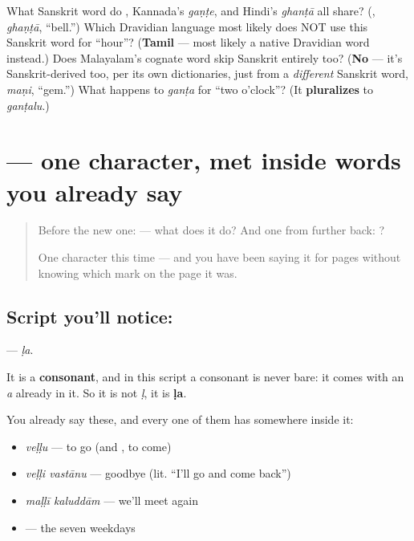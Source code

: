 \begin{tcolorbox}[breakable,colback=teal!4,colframe=teal!35!black,title={Before you move on}]
What Sanskrit word do \textbf{}, Kannada's \emph{gaṇṭe}, and Hindi's \emph{ghanṭā} all share? (\textbf{}, \emph{ghaṇṭā}, \textquotedblleft{}bell.\textquotedblright{}) Which Dravidian language most likely does NOT use this Sanskrit word for \textquotedblleft{}hour\textquotedblright{}? (\textbf{Tamil} — most likely a native Dravidian word instead.) Does Malayalam's cognate word skip Sanskrit entirely too? (\textbf{No} — it's Sanskrit-derived too, per its own dictionaries, just from a \emph{different} Sanskrit word, \emph{maṇi}, \textquotedblleft{}gem.\textquotedblright{}) What happens to \emph{ganṭa} for \textquotedblleft{}two o'clock\textquotedblright{}? (It \textbf{pluralizes} to \emph{ganṭalu}.)
\end{tcolorbox}
\section[\texorpdfstring{\te{ళ} (ḷa)}{ళ (ḷa)}]{ — one character, met inside words you already say}

\label{lesson:TE-S121-letter-lla}



\begin{quote}
Before the new one:  — what does it do? And one from further back: ?

One character this time — and you have been saying it for pages without knowing which mark on the page it was.
\end{quote}

\subsection*{Script you'll notice: }
\textbf{} — \emph{ḷa}.

It is a \textbf{consonant}, and in this script a consonant is never bare: it comes with an \emph{a} already in it. So it is not \emph{ḷ}, it is \textbf{ḷa}.

You already say these, and every one of them has  somewhere inside it:

\begin{itemize}
\raggedright
  \item \textbf{} \emph{veḷḷu} — to go (and , to come)
  \item \textbf{ } \emph{veḷḷi vastānu} — goodbye (lit. \textquotedblleft{}I'll go and come back\textquotedblright{})
  \item \textbf{ } \emph{maḷḷī kaluddām} — we'll meet again
  \item \textbf{      } — the seven weekdays
\end{itemize}

